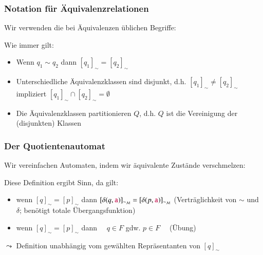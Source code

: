 \documentclass[aspectratio=1610,onlymath]{beamer}
\begin{document}
\begin{frame}\frametitle{Notation für Äquivalenzrelationen}

Wir verwenden die bei Äquivalenzen üblichen Begriffe:
\medskip

Wie immer gilt:
\begin{itemize}
\item Wenn $q_1\sim q_2$ dann $[q_1]_{\sim}=[q_2]_{\sim}$
\item Unterschiedliche Äquivalenzklassen sind disjunkt, d.h. $[q_1]_{\sim}\neq [q_2]_{\sim}$ impliziert $[q_1]_{\sim}\cap [q_2]_{\sim}=\emptyset$
\item Die Äquivalenzklassen partitionieren $Q$, d.h. $Q$ ist die Vereinigung der (disjunkten) Klassen
\end{itemize}

\end{frame}

\begin{frame}\frametitle{Der Quotientenautomat}

Wir vereinfachen Automaten, indem wir äquivalente Zustände verschmelzen:

\pause

Diese Definition ergibt Sinn, da gilt:
\begin{itemize}
\item wenn $[q]_{\sim}=[p]_{\sim}$ dann $[\delta(q,\mathtt{\textcolor{purple}{a}})]_{\sim_{\mathcal{M}}}=[\delta(p,\mathtt{\textcolor{purple}{a}})]_{\sim_{\mathcal{M}}}$ (Verträglichkeit von $\sim$ und $\delta$; benötigt totale Übergangsfunktion)
\item wenn $[q]_{\sim}=[p]_{\sim}$ dann ~~$q\in F$ gdw. $p\in F$ ~~(Übung)
\end{itemize}
$\leadsto$ Definition unabhängig vom gewählten Repräsentanten von $[q]_{\sim}$

\end{frame}
\end{document}
